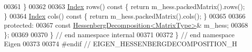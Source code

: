 \begin{DoxyCode}
00361     \}
00362 
00363     \hyperlink{namespace_eigen_a62e77e0933482dafde8fe197d9a2cfde}{Index} rows()\textcolor{keyword}{ const }\{ \textcolor{keywordflow}{return} m\_hess.packedMatrix().rows(); \}
00364     \hyperlink{namespace_eigen_a62e77e0933482dafde8fe197d9a2cfde}{Index} cols()\textcolor{keyword}{ const }\{ \textcolor{keywordflow}{return} m\_hess.packedMatrix().cols(); \}
00365 
00366   \textcolor{keyword}{protected}:
00367     \textcolor{keyword}{const} \hyperlink{group___eigenvalues___module}{HessenbergDecomposition<MatrixType>}& m\_hess;
00368 \};
00369 
00370 \} \textcolor{comment}{// end namespace internal}
00371 
00372 \} \textcolor{comment}{// end namespace Eigen}
00373 
00374 \textcolor{preprocessor}{#endif // EIGEN\_HESSENBERGDECOMPOSITION\_H}
\end{DoxyCode}
